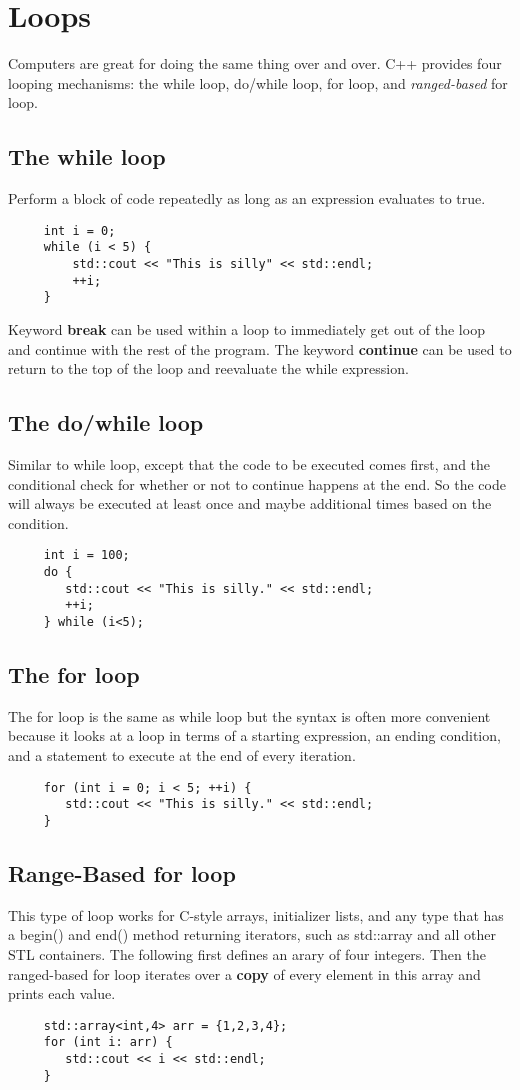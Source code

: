 \documentclass{article}
\begin{document}
\section{Loops}
Computers are great for doing the same thing over and over. C++ provides four looping mechanisms:
the while loop, do/while loop, for loop, and \textit{ranged-based} for loop.
\subsection{The while loop}
Perform a block of code repeatedly as long as an expression evaluates to true.
\begin{verbatim}
     int i = 0;
     while (i < 5) {
         std::cout << "This is silly" << std::endl;
         ++i;
     }
\end{verbatim}
Keyword \textbf{break} can be used within a loop to immediately get out of the loop and continue with
the rest of the program. The keyword \textbf{continue} can be used to return to the top of the loop and
reevaluate the while expression.
\subsection{The do/while loop}
Similar to while loop, except that the code to be executed comes first, and the conditional check for
whether or not to continue happens at the end. So the code will always be executed at least once and
maybe additional times based on the condition.
\begin{verbatim}
     int i = 100;
     do {
        std::cout << "This is silly." << std::endl;
        ++i;
     } while (i<5);
\end{verbatim}
\subsection{The for loop}
The for loop is the same as while loop but the syntax is often more convenient because it looks at a
loop in terms of a starting expression, an ending condition, and a statement to execute at the end of
every iteration.
\begin{verbatim}
     for (int i = 0; i < 5; ++i) {
        std::cout << "This is silly." << std::endl;
     }
\end{verbatim}
\subsection{Range-Based for loop}
This type of loop works for C-style arrays, initializer lists, and any type that has a begin() and
end() method returning iterators, such as std::array and all other STL containers.
The following first defines an arary of four integers. Then the ranged-based for loop iterates over
a \textbf{copy} of every element in this array and prints each value.
\begin{verbatim}
     std::array<int,4> arr = {1,2,3,4};
     for (int i: arr) {
        std::cout << i << std::endl;
     }
\end{verbatim}
\end{document}
